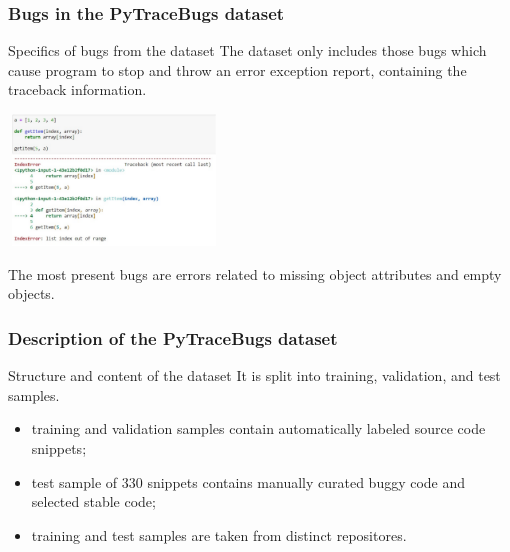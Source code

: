 \documentclass{beamer}
\begin{document}
\begin{frame}
\frametitle{Bugs in the PyTraceBugs dataset}

\begin{block}{Specifics of bugs from the dataset}
The dataset only includes those bugs which cause program to stop and throw an error exception report, containing the traceback information.
\end{block}

\begin{center}
\includegraphics[height=3.5cm, width=5.6cm]{traceback.pdf}
\end{center}

The most present bugs are errors related to missing object attributes and empty objects.
\end{frame}

\begin{frame}
\frametitle{Description of the PyTraceBugs dataset}

\begin{block}{Structure and content of the dataset}
It is split into training, validation, and test samples.
\begin{itemize}
\item training and validation samples contain automatically labeled source code snippets;
\item test sample of 330 snippets contains manually curated buggy code and selected stable code;
\item training and test samples are taken from distinct repositores.
\end{itemize}
\end{block}


\end{frame}
\end{document}
